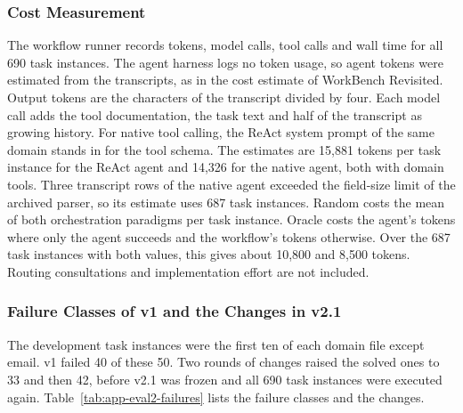\subsubsection{Cost Measurement}
\label{app:eval2/cost}
The workflow runner records tokens, model calls, tool calls and wall time for all 690 task instances. The agent harness logs no token usage, so agent tokens were estimated from the transcripts, as in the cost estimate of WorkBench Revisited. Output tokens are the characters of the transcript divided by four. Each model call adds the tool documentation, the task text and half of the transcript as growing history. For native tool calling, the ReAct system prompt of the same domain stands in for the tool schema. The estimates are 15,881 tokens per task instance for the ReAct agent and 14,326 for the native agent, both with domain tools. Three transcript rows of the native agent exceeded the field-size limit of the archived parser, so its estimate uses 687 task instances. Random costs the mean of both orchestration paradigms per task instance. Oracle costs the agent's tokens where only the agent succeeds and the workflow's tokens otherwise. Over the 687 task instances with both values, this gives about 10,800 and 8,500 tokens. Routing consultations and implementation effort are not included.

\subsubsection{Failure Classes of v1 and the Changes in v2.1}
\label{app:eval2/revision}
The development task instances were the first ten of each domain file except email. v1 failed 40 of these 50. Two rounds of changes raised the solved ones to 33 and then 42, before v2.1 was frozen and all 690 task instances were executed again. Table~\ref{tab:app-eval2-failures} lists the failure classes and the changes.

